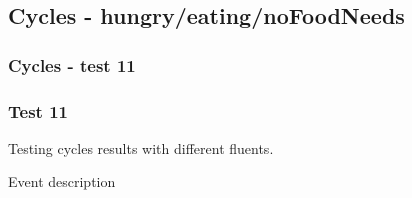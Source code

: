 \documentclass[8pt]{beamer}
\begin{document}
\subsection{Cycles - hungry/eating/noFoodNeeds}
\begin{frame}
    \frametitle{Cycles - test 11}
    \subsubsection{Test 11}
    \small
    Testing cycles results with different fluents.\linebreak
    \begin{minipage}{0.4\linewidth}
        \begin{table}[t!]
            \caption{Event description}
            \begin{center}


\end{center}
\end{table}
\end{minipage}
\end{frame}
\end{document}
